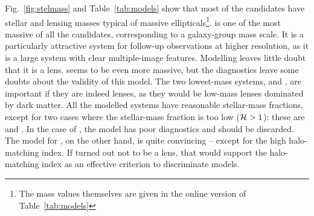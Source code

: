 Fig.~\ref{fig:stelmass} and Table~\ref{tab:models} show that most of the
candidates have stellar
and lensing masses typical of massive ellipticals\footnote{The mass values
themselves are given in the online version of Table~\ref{tab:models}}.
 is one of the most massive of all the candidates, corresponding
to a galaxy-group mass scale.  It is a particularly attractive system
for follow-up observations at higher resolution, as it is a large
system with clear multiple-image features. Modelling leaves little
doubt that it is a lens.   seems to be even more massive, but the
diagnostics leave some doubts about the validity of this model.  The
two lowest-mass systems,  and , are important if they are
indeed lenses, as they would be low-mass lenses dominated by dark
matter.  All the modelled systems have reasonable stellar-mass
fractions, except for two cases where the stellar-mass fraction is too
low ($\mathcal{H} > 1$): these are  and .  In the case of ,
the model has poor diagnostics and should be discarded.  The model
for , on the other hand, is quite convincing -- except for the
high halo-matching index.  If  turned out not to be a lens, that
would support the halo-matching index as an effective criterion to
discriminate models.

